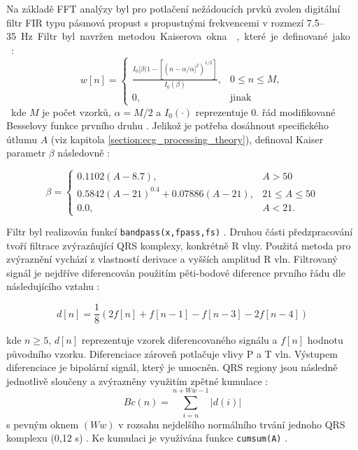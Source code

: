 Na základě FFT analýzy byl pro potlačení nežádoucích prvků zvolen digitální
filtr FIR typu pásmová propust s propustnými frekvencemi v rozmezí
7.5--35~\si\Hz. Filtr byl navržen metodou Kaiserova okna \cite{Chavan2006},
které je definované jako \cite{Oppenheim1999}:

\begin{equation}
    \label{eq:kaiser1}
    w[n] =
    \begin{cases}
        \frac{I_0[\beta(1-[(n-\alpha/\alpha]^2)^{1/2}]}{I_0(\beta)}, & 0 \leq n \leq M, \\
        0,                                                           & \text{jinak}
    \end{cases}
\end{equation}

kde $M$ je počet vzorků, $\alpha=M/2$ a $I_0(\cdot)$ reprezentuje 0. řád
modifikované Besselovy funkce prvního druhu \cite{BesselFcn}. Jelikož je potřeba
dosáhnout specifického útlumu $A$ (viz kapitola
\ref{section:ecg_processing_theory}), definoval Kaiser parametr $\beta$
následovně \cite{Oppenheim1999}:

\begin{equation}
    \beta =
    \begin{cases}
        0.1102(A-8.7),                    & A > 50            \\
        0.5842(A-21)^0.4 + 0.07886(A-21), & 21 \leq A \leq 50 \\
        0.0,                              & A < 21.
    \end{cases}
\end{equation}

Filtr byl realizován funkcí \texttt{bandpass(x,fpass,fs)} \cite{matlabBANDPASS}.
Druhou části předzpracování tvoří filtrace zvýrazňující QRS komplexy, konkrétně
R vlny. Použitá metoda pro zvýraznění vychází z vlastností derivace a vyšších
amplitud R vln. Filtrovaný signál je nejdříve diferencován použitím pěti-bodové
diference prvního řádu dle následujícího vztahu \cite{Wang2017}:

\begin{equation}
    \label{eq:differentiation}
    d[n] = \frac{1}{8}(2f[n] + f[n-1] - f[n-3] - 2f[n-4])
\end{equation}

kde $n \geq 5$, $d[n]$ reprezentuje vzorek diferencovaného signálu a $f[n]$
hodnotu původního vzorku. Diferenciace zároveň potlačuje vlivy P a T vln.
Výstupem diferenciace je bipolární signál, který je umocněn. QRS regiony jsou
následně jednotlivě sloučeny a zvýrazněny využitím zpětné kumulace
\cite{Wang2017}:
\begin{equation}
    \label{eq:backward_cumulation}
    Bc(n) = \sum_{i=n}^{n+Ww-1} |d(i)|
\end{equation}
s pevným oknem $(Ww)$ v rozsahu nejdelšího normálního trvání jednoho QRS
komplexu (0,12 s) \cite{Wang2017}. Ke kumulaci je využívána funkce
\texttt{cumsum(A)} \cite{matlabCUMSUM}.

